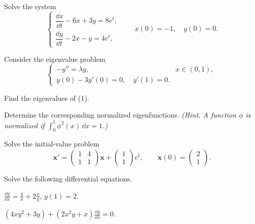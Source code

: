 \documentclass[11pt,oneside]{article}
\begin{document}
\begin{problem}
Solve the system
\[\begin{cases}\dfrac{\dd x}{\dd t}-6x+3y=8e^t,\\[0.3em]\dfrac{\dd y}{\dd t}-2x-y=4e^t,\end{cases}\qquad x(0)=-1,\quad y(0)=0.\]
\end{problem}

\begin{problem}
Consider the eigenvalue problem
\[
\begin{cases}
-y''=\lambda y,&x\in(0,1),\\
y(0)-3y'(0)=0,\quad y'(1)=0.
\end{cases}\tag{1}
\]
\begin{problemsubparts}
\item Find the eigenvalues of (1).
\item Determine the corresponding normalized eigenfunctions. \textit{(Hint. A function $\phi$ is normalized if $\int_0^1\phi^2(x)\,\dd x=1$.)}
\end{problemsubparts}
\end{problem}

\begin{problem}
Solve the initial-value problem
\[\mathbf x'=\begin{pmatrix}1&4\\1&1\end{pmatrix}\mathbf x+\begin{pmatrix}1\\1\end{pmatrix}e^t,\qquad\mathbf x(0)=\begin{pmatrix}2\\1\end{pmatrix}.\]
\end{problem}

\begin{problem}
Solve the following differential equations.
\begin{problemsubparts}
\item $\displaystyle\frac{\dd y}{\dd x}=\frac{y}{x}+2\frac{x}{y}$, $y(1)=2$.
\item $\displaystyle(4xy^2+3y)+(2x^2y+x)\frac{\dd y}{\dd x}=0$.
\end{problemsubparts}
\end{problem}
\end{document}
